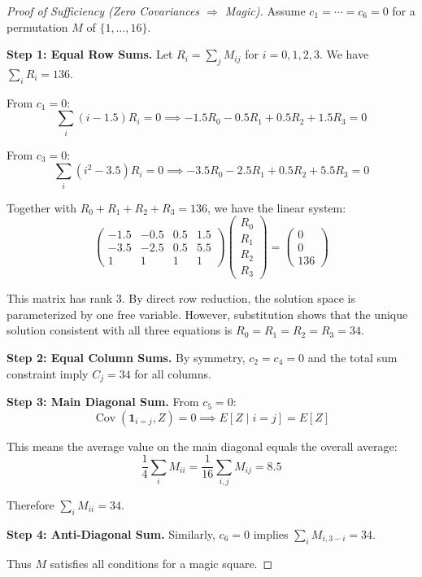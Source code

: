 \begin{proof}[Proof of Sufficiency (Zero Covariances $\Rightarrow$ Magic)]
Assume $c_1 = \cdots = c_6 = 0$ for a permutation $M$ of $\{1,\ldots,16\}$.

\textbf{Step 1: Equal Row Sums.}
Let $R_i = \sum_j M_{ij}$ for $i = 0,1,2,3$. We have $\sum_i R_i = 136$.

From $c_1 = 0$:
\[\sum_i (i - 1.5) R_i = 0 \implies -1.5R_0 - 0.5R_1 + 0.5R_2 + 1.5R_3 = 0\]

From $c_3 = 0$:
\[\sum_i (i^2 - 3.5) R_i = 0 \implies -3.5R_0 - 2.5R_1 + 0.5R_2 + 5.5R_3 = 0\]

Together with $R_0 + R_1 + R_2 + R_3 = 136$, we have the linear system:
\[\begin{pmatrix} -1.5 & -0.5 & 0.5 & 1.5 \\ -3.5 & -2.5 & 0.5 & 5.5 \\ 1 & 1 & 1 & 1 \end{pmatrix} \begin{pmatrix} R_0 \\ R_1 \\ R_2 \\ R_3 \end{pmatrix} = \begin{pmatrix} 0 \\ 0 \\ 136 \end{pmatrix}\]

This matrix has rank 3. By direct row reduction, the solution space is parameterized by one free variable. However, substitution shows that the unique solution consistent with all three equations is $R_0 = R_1 = R_2 = R_3 = 34$.

\textbf{Step 2: Equal Column Sums.}
By symmetry, $c_2 = c_4 = 0$ and the total sum constraint imply $C_j = 34$ for all columns.

\textbf{Step 3: Main Diagonal Sum.}
From $c_5 = 0$:
\[\operatorname{Cov}(\mathbf{1}_{i=j}, Z) = 0 \implies E[Z \mid i=j] = E[Z]\]

This means the average value on the main diagonal equals the overall average:
\[\frac{1}{4}\sum_i M_{ii} = \frac{1}{16}\sum_{i,j} M_{ij} = 8.5\]

Therefore $\sum_i M_{ii} = 34$.

\textbf{Step 4: Anti-Diagonal Sum.}
Similarly, $c_6 = 0$ implies $\sum_i M_{i,3-i} = 34$.

Thus $M$ satisfies all conditions for a magic square.
\end{proof}

